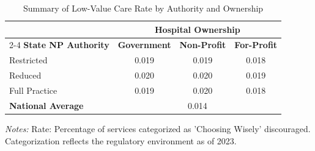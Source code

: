 \begin{table}[htbp]
    \centering
    \caption{Summary of Low-Value Care Rate by Authority and Ownership}
    \label{tab:partb_low_value_rate_own}
    \vspace{0.2cm}
    \begin{tabular}{lccc}
        \toprule
        & \multicolumn{3}{c}{\textbf{Hospital Ownership}} \\
        \cmidrule(lr){2-4}
        \textbf{State NP Authority} & \textbf{Government} & \textbf{Non-Profit} & \textbf{For-Profit} \\
        \midrule
        Restricted & 0.019 & 0.019 & 0.018 \\
        Reduced & 0.020 & 0.020 & 0.019 \\
        Full Practice & 0.019 & 0.020 & 0.018 \\
        \midrule
        \textbf{National Average} & \multicolumn{3}{c}{0.014} \\
        \bottomrule
    \end{tabular}
    \vspace{0.1cm}
    \begin{minipage}{0.85\textwidth}
        \footnotesize \textit{Notes:} Rate: Percentage of services categorized as 'Choosing Wisely' discouraged. Categorization reflects the regulatory environment as of 2023.
    \end{minipage}
\end{table}